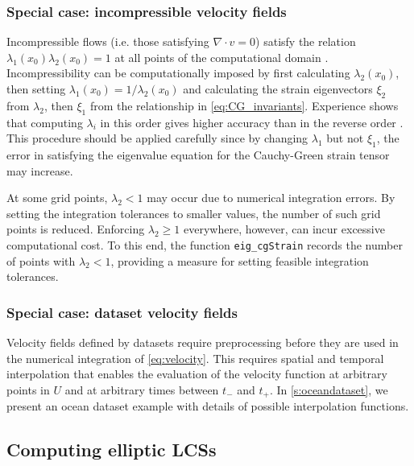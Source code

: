 \documentclass{article}
\begin{document}
\subsubsection{Special case: incompressible velocity fields}

\begin{sloppypar}
Incompressible flows (i.e. those satisfying $\nabla \cdot v=0$) satisfy the relation $\lambda_1(x_0) \lambda_2(x_0) = 1$ at all points of the computational domain \parencite{arnold89:_mathem}.
Incompressibility can be computationally imposed by first calculating $\lambda_2(x_0)$, then setting $\lambda_1(x_0) = 1/\lambda_2(x_0)$ and calculating the strain eigenvectors $\xi_2$ from $\lambda_2$, then $\xi_1$ from the relationship in \cref{eq:CG_invariants}.
Experience shows that computing $\lambda_i$ in this order gives higher accuracy than in the reverse order \parencite{farazmand12:_comput_lagran}.
This procedure should be applied carefully since by changing $\lambda_1$ but not $\xi_1$, the error in satisfying the eigenvalue equation for the Cauchy-Green strain tensor may increase.
\end{sloppypar}

At some grid points, $\lambda_2 < 1$ may occur due to numerical integration errors. By setting the integration tolerances to smaller values, the number of such grid points is reduced. Enforcing $\lambda_2 \geq 1$ everywhere, however, can incur excessive computational cost. To this end, the function \lstinline!eig_cgStrain! records the number of points with $\lambda_2 < 1$, providing a measure for setting feasible integration tolerances.

\subsubsection{Special case: dataset velocity fields}

Velocity fields defined by datasets require preprocessing before they are used in the numerical integration of \cref{eq:velocity}. This requires spatial and temporal interpolation that enables the evaluation of the velocity function at arbitrary points in $U$ and at arbitrary times between $t_-$ and $t_+$. In \cref{s:oceandataset}, we present an ocean dataset example with details of possible interpolation functions.

\subsection{Computing elliptic LCSs}
\end{document}
